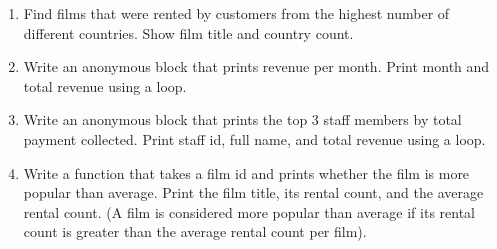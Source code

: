 \documentclass[12pt,a4paper]{article}
\newif\ifshowsolutions
\begin{document}
\begin{enumerate}
\item Find films that were rented by customers from the highest 
number of different countries. Show film title and country count.

\ifshowsolutions
\begin{lstlisting}[language=SQL]
SELECT f.title,
       COUNT(DISTINCT co.country_id) AS country_count
FROM film f
JOIN inventory i ON i.film_id = f.film_id
JOIN rental r ON r.inventory_id = i.inventory_id
JOIN customer c ON c.customer_id = r.customer_id
JOIN address a ON a.address_id = c.address_id
JOIN city ci ON ci.city_id = a.city_id
JOIN country co ON co.country_id = ci.country_id
GROUP BY f.film_id, f.title
ORDER BY country_count DESC
LIMIT 5;
\end{lstlisting}
\fi


\item Write an anonymous block that prints revenue per month. Print month and total revenue using a loop.

\ifshowsolutions
\begin{lstlisting}[language=SQL]
DO $$
DECLARE
    rec RECORD;
BEGIN
    FOR rec IN
        SELECT TO_CHAR(p.payment_date, 'YYYY-MM') AS month,
               SUM(p.amount) AS revenue
        FROM payment p
        GROUP BY TO_CHAR(p.payment_date, 'YYYY-MM')
        ORDER BY month
    LOOP
        RAISE NOTICE 'Month % -> Revenue %', rec.month, rec.revenue;
    END LOOP;
END $$;
\end{lstlisting}
\fi


\item Write an anonymous block that prints the top 3 staff members by total payment collected.
Print staff id, full name, and total revenue using a loop.

\ifshowsolutions
\begin{lstlisting}[language=SQL]
DO $$
DECLARE
    rec RECORD;
    i INT := 0;
BEGIN
    FOR rec IN
        SELECT s.staff_id, s.first_name, s.last_name,
               SUM(p.amount) AS total_revenue
        FROM staff s
        JOIN payment p ON p.staff_id = s.staff_id
        GROUP BY s.staff_id, s.first_name, s.last_name
        ORDER BY total_revenue DESC, s.staff_id
    LOOP
        i := i + 1;
        EXIT WHEN i > 3;

        RAISE NOTICE '%) Staff %: % % (Revenue=%)',
            i, rec.staff_id, rec.first_name, rec.last_name, rec.total_revenue;
    END LOOP;
END $$;
\end{lstlisting}
\fi

\item Write a function that takes a film id and prints whether the film is more popular than average. Print the film title, its rental count, and the average rental count. (A film is considered more popular than average if its rental count is
greater than the average rental count per film).


\end{enumerate}
\end{document}
